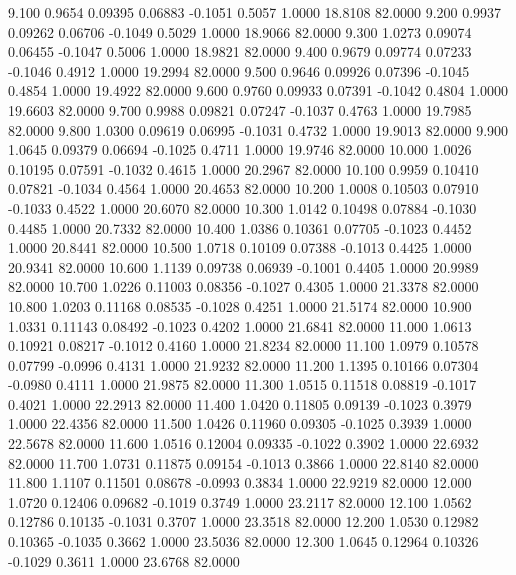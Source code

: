    9.100   0.9654   0.09395   0.06883  -0.1051   0.5057   1.0000  18.8108  82.0000
   9.200   0.9937   0.09262   0.06706  -0.1049   0.5029   1.0000  18.9066  82.0000
   9.300   1.0273   0.09074   0.06455  -0.1047   0.5006   1.0000  18.9821  82.0000
   9.400   0.9679   0.09774   0.07233  -0.1046   0.4912   1.0000  19.2994  82.0000
   9.500   0.9646   0.09926   0.07396  -0.1045   0.4854   1.0000  19.4922  82.0000
   9.600   0.9760   0.09933   0.07391  -0.1042   0.4804   1.0000  19.6603  82.0000
   9.700   0.9988   0.09821   0.07247  -0.1037   0.4763   1.0000  19.7985  82.0000
   9.800   1.0300   0.09619   0.06995  -0.1031   0.4732   1.0000  19.9013  82.0000
   9.900   1.0645   0.09379   0.06694  -0.1025   0.4711   1.0000  19.9746  82.0000
  10.000   1.0026   0.10195   0.07591  -0.1032   0.4615   1.0000  20.2967  82.0000
  10.100   0.9959   0.10410   0.07821  -0.1034   0.4564   1.0000  20.4653  82.0000
  10.200   1.0008   0.10503   0.07910  -0.1033   0.4522   1.0000  20.6070  82.0000
  10.300   1.0142   0.10498   0.07884  -0.1030   0.4485   1.0000  20.7332  82.0000
  10.400   1.0386   0.10361   0.07705  -0.1023   0.4452   1.0000  20.8441  82.0000
  10.500   1.0718   0.10109   0.07388  -0.1013   0.4425   1.0000  20.9341  82.0000
  10.600   1.1139   0.09738   0.06939  -0.1001   0.4405   1.0000  20.9989  82.0000
  10.700   1.0226   0.11003   0.08356  -0.1027   0.4305   1.0000  21.3378  82.0000
  10.800   1.0203   0.11168   0.08535  -0.1028   0.4251   1.0000  21.5174  82.0000
  10.900   1.0331   0.11143   0.08492  -0.1023   0.4202   1.0000  21.6841  82.0000
  11.000   1.0613   0.10921   0.08217  -0.1012   0.4160   1.0000  21.8234  82.0000
  11.100   1.0979   0.10578   0.07799  -0.0996   0.4131   1.0000  21.9232  82.0000
  11.200   1.1395   0.10166   0.07304  -0.0980   0.4111   1.0000  21.9875  82.0000
  11.300   1.0515   0.11518   0.08819  -0.1017   0.4021   1.0000  22.2913  82.0000
  11.400   1.0420   0.11805   0.09139  -0.1023   0.3979   1.0000  22.4356  82.0000
  11.500   1.0426   0.11960   0.09305  -0.1025   0.3939   1.0000  22.5678  82.0000
  11.600   1.0516   0.12004   0.09335  -0.1022   0.3902   1.0000  22.6932  82.0000
  11.700   1.0731   0.11875   0.09154  -0.1013   0.3866   1.0000  22.8140  82.0000
  11.800   1.1107   0.11501   0.08678  -0.0993   0.3834   1.0000  22.9219  82.0000
  12.000   1.0720   0.12406   0.09682  -0.1019   0.3749   1.0000  23.2117  82.0000
  12.100   1.0562   0.12786   0.10135  -0.1031   0.3707   1.0000  23.3518  82.0000
  12.200   1.0530   0.12982   0.10365  -0.1035   0.3662   1.0000  23.5036  82.0000
  12.300   1.0645   0.12964   0.10326  -0.1029   0.3611   1.0000  23.6768  82.0000
